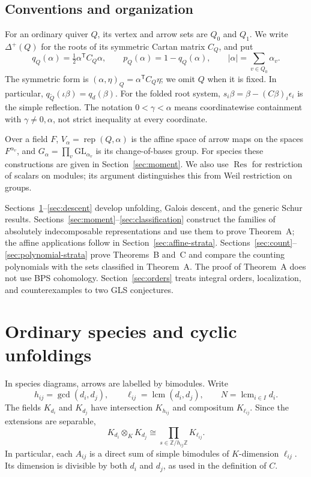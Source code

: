 \documentclass[11pt, reqno]{amsart}
\numberwithin{equation}{section}
\theoremstyle{definition}
\theoremstyle{remark}
\newcommand{\op}[1]{\operatorname{#1}}
\newcommand{\mr}[1]{\mathrm{#1}}
\newcommand{\mb}[1]{\mathbb{#1}}
\newcommand{\lcm}{\op{lcm}}
\newcommand{\Res}{\op{Res}}
\newcommand{\Rep}{\op{rep}}
\newcommand{\Qbar}{\widetilde Q}
\newcommand{\iso}{\cong}
\begin{document}
\subsection*{Conventions and organization}
For an ordinary quiver $Q$, its vertex and arrow sets are $Q_0$ and
$Q_1$. We write $\Delta^+(Q)$ for the roots of its symmetric Cartan
matrix $C_Q$, and put
\[ q_Q(\alpha)=\tfrac12\alpha^{\mathsf T}C_Q\alpha,\qquad p_Q(\alpha)=1-q_Q(\alpha),\qquad |\alpha|=\sum_{v\in Q_0}\alpha_v. \]
The symmetric form is $(\alpha,\eta)_Q=\alpha^{\mathsf T}C_Q\eta$;
we omit $Q$ when it is fixed. In particular,
$q_{\Qbar}(\iota\beta)=q_d(\beta)$. For the folded root system,
$s_i\beta=\beta-(C\beta)_i\epsilon_i$ is the simple reflection.
The notation $0<\gamma<\alpha$ means coordinatewise containment with
$\gamma\ne0,\alpha$, not strict inequality at every coordinate.

Over a field $F$, $V_\alpha=\Rep(Q,\alpha)$ is the affine space of
arrow maps on the spaces $F^{\alpha_v}$, and
$G_\alpha=\prod_v\mr{GL}_{\alpha_v}$ is its change-of-bases group.
For species these constructions are given in Section~\ref{sec:moment}.
We also use $\Res$ for restriction of scalars on modules; its
argument distinguishes this from Weil restriction on groups.

Sections~\ref{sec:unfold}--\ref{sec:descent} develop unfolding,
Galois descent, and the generic Schur results.
Sections~\ref{sec:moment}--\ref{sec:classification} construct the
families of absolutely indecomposable representations and use them to
prove Theorem~A; the affine applications follow in
Section~\ref{sec:affine-strata}.
Sections~\ref{sec:count}--\ref{sec:polynomial-strata} prove
Theorems~B and~C and compare the counting polynomials with the sets
classified in Theorem~A. The proof of Theorem~A does not use BPS
cohomology. Section~\ref{sec:orders} treats integral orders,
localization, and counterexamples to two GLS conjectures.

\clearpage

\section{Ordinary species and cyclic unfoldings}\label{sec:unfold}

In species diagrams, arrows are labelled by bimodules.
Write
\[ h_{ij}=\gcd(d_i,d_j),\qquad \ell_{ij}=\lcm(d_i,d_j), \qquad N=\lcm_{i\in I}d_i. \]
The fields $K_{d_i}$ and $K_{d_j}$ have intersection $K_{h_{ij}}$ and
compositum $K_{\ell_{ij}}$. Since the extensions are separable,
\begin{equation}\label{eq:tensorfields} K_{d_i}\otimes_K K_{d_j}\iso \prod_{s\in\mb Z/h_{ij}\mb Z}K_{\ell_{ij}}.\end{equation}
In particular, each $A_{ij}$ is a direct sum of simple bimodules of
$K$-dimension $\ell_{ij}$. Its dimension is divisible by both $d_i$
and $d_j$, as used in the definition of $C$.
\end{document}
